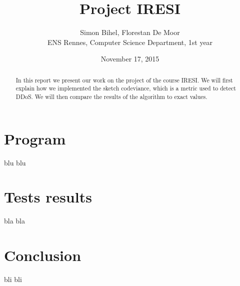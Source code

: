 \documentclass[a4paper]{article}%
\begin{document}
\title{Project IRESI}

\author{Simon Bihel, Florestan De Moor \\ ENS Rennes, Computer Science Department, 1st year}

\date{November 17, 2015}

\maketitle

\begin{abstract}
	In this report we present our work on the project of the course IRESI. We will first explain how we implemented the sketch codeviance, which is a metric used to detect DDoS. We will then compare the results of the algorithm to exact values.
\end{abstract}

\section{Program} blu blu

\section{Tests results} bla bla

\section{Conclusion} bli bli


\clearpage
\end{document}
